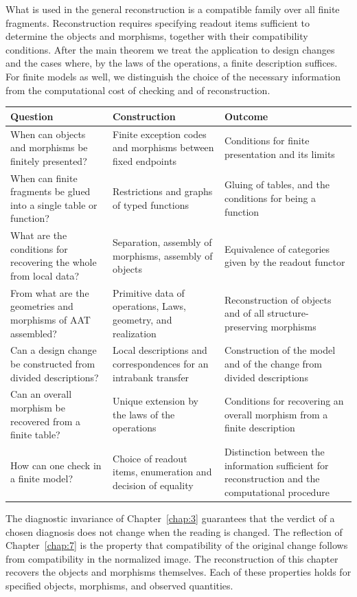 What is used in the general reconstruction is a compatible family over all finite fragments.
Reconstruction requires specifying readout items sufficient to determine the objects and
morphisms, together with their compatibility conditions.
After the main theorem we treat the application to design changes and the cases where, by the laws of the operations, a finite
description suffices.
For finite models as well, we distinguish the choice of the necessary information from the
computational cost of checking and of reconstruction.

\begin{xltabular}{\linewidth}{@{}LLL@{}}
\toprule
Question & Construction & Outcome \\
\midrule
\endhead
When can objects and morphisms be finitely presented? & Finite exception codes and morphisms between fixed endpoints & Conditions for finite presentation and its limits \\
\addlinespace[3pt]
When can finite fragments be glued into a single table or function? & Restrictions and graphs of typed functions & Gluing of tables, and the conditions for being a function \\
\addlinespace[3pt]
What are the conditions for recovering the whole from local data? & Separation, assembly of morphisms, assembly of objects & Equivalence of categories given by the readout functor \\
\addlinespace[3pt]
From what are the geometries and morphisms of AAT assembled? & Primitive data of operations, Laws, geometry, and realization & Reconstruction of objects and of all structure-preserving morphisms \\
\addlinespace[3pt]
Can a design change be constructed from divided descriptions? & Local descriptions and correspondences for an intrabank transfer & Construction of the model and of the change from divided descriptions \\
\addlinespace[3pt]
Can an overall morphism be recovered from a finite table? & Unique extension by the laws of the operations & Conditions for recovering an overall morphism from a finite description \\
\addlinespace[3pt]
How can one check in a finite model? & Choice of readout items, enumeration and decision of equality & Distinction between the information sufficient for reconstruction and the computational procedure \\
\bottomrule
\end{xltabular}

The diagnostic invariance of Chapter~\ref{chap:3} guarantees that the verdict of a chosen
diagnosis does not change when the reading is changed.
The reflection of Chapter~\ref{chap:7} is the property that compatibility of the original
change follows from compatibility in the normalized image.
The reconstruction of this chapter recovers the objects and morphisms themselves.
Each of these properties holds for specified objects, morphisms, and observed quantities.

